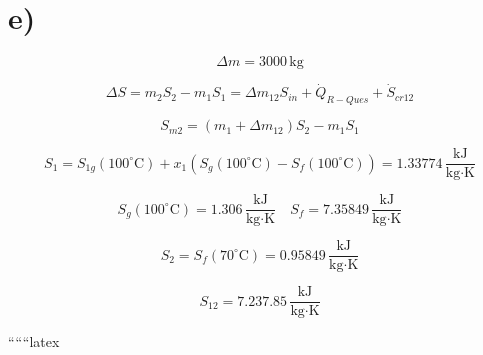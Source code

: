 

\section*{e)}

\[
\Delta m = 3000 \, \text{kg}
\]

\[
\Delta S = m_2 S_2 - m_1 S_1 = \Delta m_{12} S_{in} + \dot{Q}_{R-Ques} + \dot{S}_{cr12}
\]

\[
S_{m2} = (m_1 + \Delta m_{12}) S_2 - m_1 S_1
\]

\[
S_1 = S_{1g} (100^\circ \text{C}) + x_1 (S_g (100^\circ \text{C}) - S_f (100^\circ \text{C})) = 1.33774 \, \frac{\text{kJ}}{\text{kg} \cdot \text{K}}
\]

\[
S_g (100^\circ \text{C}) = 1.306 \, \frac{\text{kJ}}{\text{kg} \cdot \text{K}} \quad S_f = 7.35849 \, \frac{\text{kJ}}{\text{kg} \cdot \text{K}}
\]

\[
S_2 = S_f (70^\circ \text{C}) = 0.95849 \, \frac{\text{kJ}}{\text{kg} \cdot \text{K}}
\]

\[
S_{12} = 7.237.85 \, \frac{\text{kJ}}{\text{kg} \cdot \text{K}}
\]

``````latex